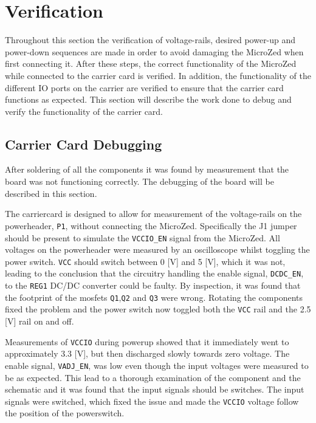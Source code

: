 \section{Verification}
Throughout this section the verification of voltage-rails, desired power-up and power-down sequences are made in order to avoid damaging the MicroZed when first connecting it.
After these steps, the correct functionality of the MicroZed while connected to the carrier card is verified. 
In addition, the functionality of the different IO ports on the carrier are verified to ensure that the carrier card functions as expected.
This section will describe the work done to debug and verify the functionality of the carrier card.

\subsection{Carrier Card Debugging}
After soldering of all the components it was found by measurement that the board was not functioning correctly.
The debugging of the board will be described in this section.

The carriercard is designed to allow for measurement of the voltage-rails on the powerheader, \texttt{P1}, without connecting the MicroZed.
Specifically the J1 jumper should be present to simulate the \texttt{VCCIO\_EN} signal from the MicroZed.
All voltages on the powerheader were measured by an oscilloscope whilst toggling the power switch.
\texttt{VCC} should switch between 0 [V] and 5 [V], which it was not, leading to the conclusion that the circuitry handling the enable signal, \texttt{DCDC\_EN}, to the \texttt{REG1} DC/DC converter could be faulty.
By inspection, it was found that the footprint of the mosfets \texttt{Q1},\texttt{Q2} and \texttt{Q3} were wrong.
Rotating the components fixed the problem and the power switch now toggled both the \texttt{VCC} rail and the 2.5 [V] rail on and off.

Measurements of \texttt{VCCIO} during powerup showed that it immediately went to approximately 3.3 [V], but then discharged slowly towards zero voltage.
The enable signal, \texttt{VADJ\_EN}, was low even though the input voltages were measured to be as expected.
This lead to a thorough examination of the component and the schematic and it was found that the input signals should be switches.
The input signals were switched, which fixed the issue and made the \texttt{VCCIO} voltage follow the position of the powerswitch.

